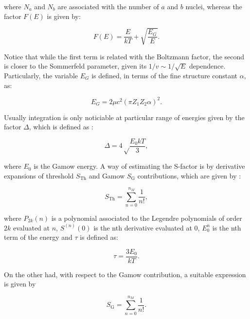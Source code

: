 \documentclass[openany]{book}
\begin{document}
where $N_a$ and $N_b$ are associated with the number of $a$ and $b$ nuclei, whereas the factor $F(E)$ is given by: 

\begin{equation}\label{eq:sfactor_Ffactor}
	F(E) = \frac{E}{kT} + \sqrt{\frac{E_G}{E}}.
\end{equation}

Notice that while the first term is related with the Boltzmann factor, the second is closer to the Sommerfeld parameter, given its $1/v \sim 1/\sqrt{E}$ dependence. Particularly, the variable $E_G$ is defined, in terms of the fine structure constant $\alpha$, as: 

\begin{equation}\label{eq:sfactor_Eg}
	E_G = 2\mu c^2 (\pi Z_1 Z_2 \alpha)^2.
\end{equation}

Usually integration is only noticiable at particular range of energies given by the factor $\Delta$, which is defined as \cite{ueda_sargeant_pato_hussein_2002}: 


\begin{equation}\label{eq:sfactor_delta}
	\Delta = 4 \sqrt \frac{E_0 kT}{3},
\end{equation}

where $E_0$ is the Gamow energy. A way of estimating the S-factor is by derivative expansions of threshold $S_{\mathrm{Th}}$ and Gamow $S_{\mathrm{G}}$ contributions, which are given by \cite{ueda_sargeant_pato_hussein_2002}: 

\begin{equation}\label{eq:sfactor_nonResonant_threshold}
	S_{\mathrm{Th}} =  \sum_{n = 0} ^{n_M} {\frac{1}{n!}}, 
\end{equation}

where $P_{2k}(n)$ is a polynomial associated to the Legendre polynomials of order $2k$ evaluated at $n$, $S^{(n)}(0)$ is the nth derivative evaluated at 0, $E^n_0$ is the nth term of the energy and $\tau$ is defined as: 

\begin{equation}\label{eq:sfactor_nonResonant_tau}
	\tau = \frac{3E_0}{kT}.
\end{equation}

On the other had, with respect to the Gamow contribution, a suitable expression is given by 

\begin{equation}\label{eq:sfactor_nonResonant_Gamow}
	S_{\mathrm{G}}  = \sum_{n = 0} ^{n_M} {\frac{1}{n!}}.
\end{equation}
\end{document}
